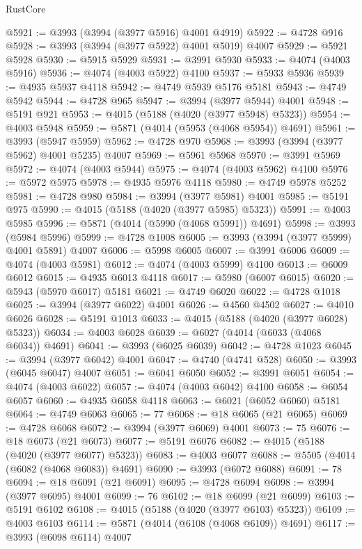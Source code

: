 \begin{lexlean}{RustCore}
\begin{coremodule}
@5921 := @3993 (@3994 (@3977 @5916) @4001 @4919)
@5922 := @4728 @916
@5928 := @3993 (@3994 (@3977 @5922) @4001 @5019) @4007
@5929 := @5921 @5928
@5930 := @5915 @5929
@5931 := @3991 @5930
@5933 := @4074 (@4003 @5916)
@5936 := @4074 (@4003 @5922) @4100
@5937 := @5933 @5936
@5939 := @4935 @5937 @4118
@5942 := @4749 @5939 @5176 @5181
@5943 := @4749 @5942
@5944 := @4728 @965
@5947 := @3994 (@3977 @5944) @4001
@5948 := @5191 @921
@5953 := @4015 (@5188 (@4020 (@3977 @5948) @5323))
@5954 := @4003 @5948
@5959 := @5871 (@4014 (@5953 (@4068 @5954)) @4691)
@5961 := @3993 (@5947 @5959)
@5962 := @4728 @970
@5968 := @3993 (@3994 (@3977 @5962) @4001 @5235) @4007
@5969 := @5961 @5968
@5970 := @3991 @5969
@5972 := @4074 (@4003 @5944)
@5975 := @4074 (@4003 @5962) @4100
@5976 := @5972 @5975
@5978 := @4935 @5976 @4118
@5980 := @4749 @5978 @5252
@5981 := @4728 @980
@5984 := @3994 (@3977 @5981) @4001
@5985 := @5191 @975
@5990 := @4015 (@5188 (@4020 (@3977 @5985) @5323))
@5991 := @4003 @5985
@5996 := @5871 (@4014 (@5990 (@4068 @5991)) @4691)
@5998 := @3993 (@5984 @5996)
@5999 := @4728 @1008
@6005 := @3993 (@3994 (@3977 @5999) @4001 @5891) @4007
@6006 := @5998 @6005
@6007 := @3991 @6006
@6009 := @4074 (@4003 @5981)
@6012 := @4074 (@4003 @5999) @4100
@6013 := @6009 @6012
@6015 := @4935 @6013 @4118
@6017 := @5980 (@6007 @6015)
@6020 := @5943 (@5970 @6017) @5181
@6021 := @4749 @6020
@6022 := @4728 @1018
@6025 := @3994 (@3977 @6022) @4001
@6026 := @4560 @4502
@6027 := @4010 @6026
@6028 := @5191 @1013
@6033 := @4015 (@5188 (@4020 (@3977 @6028) @5323))
@6034 := @4003 @6028
@6039 := @6027 (@4014 (@6033 (@4068 @6034)) @4691)
@6041 := @3993 (@6025 @6039)
@6042 := @4728 @1023
@6045 := @3994 (@3977 @6042) @4001
@6047 := @4740 (@4741 @528)
@6050 := @3993 (@6045 @6047) @4007
@6051 := @6041 @6050
@6052 := @3991 @6051
@6054 := @4074 (@4003 @6022)
@6057 := @4074 (@4003 @6042) @4100
@6058 := @6054 @6057
@6060 := @4935 @6058 @4118
@6063 := @6021 (@6052 @6060) @5181
@6064 := @4749 @6063
@6065 := 77
@6068 := @18 @6065 (@21 @6065)
@6069 := @4728 @6068
@6072 := @3994 (@3977 @6069) @4001
@6073 := 75
@6076 := @18 @6073 (@21 @6073)
@6077 := @5191 @6076
@6082 := @4015 (@5188 (@4020 (@3977 @6077) @5323))
@6083 := @4003 @6077
@6088 := @5505 (@4014 (@6082 (@4068 @6083)) @4691)
@6090 := @3993 (@6072 @6088)
@6091 := 78
@6094 := @18 @6091 (@21 @6091)
@6095 := @4728 @6094
@6098 := @3994 (@3977 @6095) @4001
@6099 := 76
@6102 := @18 @6099 (@21 @6099)
@6103 := @5191 @6102
@6108 := @4015 (@5188 (@4020 (@3977 @6103) @5323))
@6109 := @4003 @6103
@6114 := @5871 (@4014 (@6108 (@4068 @6109)) @4691)
@6117 := @3993 (@6098 @6114) @4007

\end{coremodule}
\end{lexlean}
